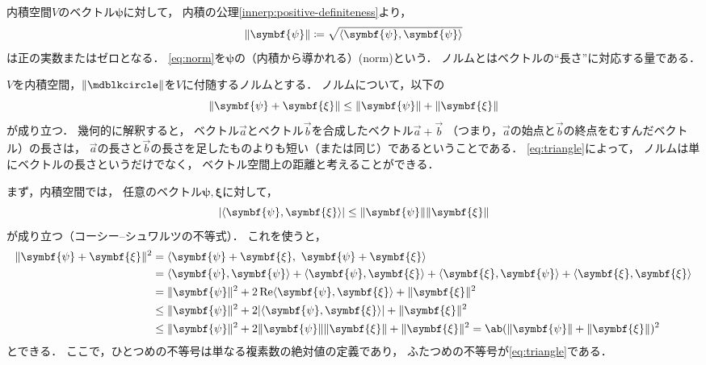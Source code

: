 \documentclass[
]{sotsu}
\newcommand{\bpsi}{\symbf{\psi}}
\newcommand{\bxi}{\symbf{\xi}}
\begin{document}
内積空間$V$のベクトル$\bpsi$に対して，
内積の公理\cref{innerp:positive-definiteness}より，
\begin{equation}
    \label{eq:norm}
    \norm{\bpsi} \coloneq \sqrt{\vphantom{\bpsi}\smash{\iparen{\bpsi, \bpsi}}}
\end{equation}
は正の実数またはゼロとなる．
\cref{eq:norm}を$\bpsi$の（内積から導かれる）(norm)という．
ノルムとはベクトルの``長さ''に対応する量である．

$V$を内積空間，$\norm{\bigdot}$を$V$に付随するノルムとする．
ノルムについて，以下の
\begin{equation}
    \label{eq:triangle}
    \norm{\bpsi + \bxi}
    \leq \norm{\bpsi} + \norm{\bxi}
\end{equation}
が成り立つ．
幾何的に解釈すると，
ベクトル$\vec{a}$とベクトル$\vec{b}$を合成したベクトル$\vec{a} + \vec{b}$
（つまり，$\vec{a}$の始点と$\vec{b}$の終点をむすんだベクトル）の長さは，
$\vec{a}$の長さと$\vec{b}$の長さを足したものよりも短い（または同じ）であるということである．
\cref{eq:triangle}によって，
ノルムは単にベクトルの長さというだけでなく，
ベクトル空間上の距離と考えることができる．

まず，内積空間では，
任意のベクトル$\bpsi, \bxi$に対して，
\begin{equation}
    \label{eq:Cauchy-Schwarz}
    \abs{\iparen{\bpsi, \bxi}} \leq \norm{\bpsi} \norm{\bxi}
\end{equation}
が成り立つ（コーシー--シュワルツの不等式）．
これを使うと，
\begin{equation*}
    \begin{split}
        \norm{\bpsi + \bxi}^2
        &= \iparen{\bpsi + \bxi, \  \bpsi + \bxi}
        \\
        &= \iparen{\bpsi, \bpsi}
            + \iparen{\bpsi, \bxi}
            + \iparen{\bxi, \bpsi}
            + \iparen{\bxi, \bxi}
        \\
        &= \norm{\bpsi}^2
            + 2 \Real \iparen{\bpsi, \bxi}
            + \norm{\bxi}^2
        \\
        &\leq \norm{\bpsi}^2 + 2 \abs{ \iparen{\bpsi, \bxi} } + \norm{\bxi}^2
        \\
        &\leq \norm{\bpsi}^2 + 2 \norm{\bpsi} \norm{\bxi} + \norm{\bxi}^2
        = \ab(\norm{\bpsi} + \norm{\bxi})^2
    \end{split}
\end{equation*}
とできる．
ここで，ひとつめの不等号は単なる複素数の絶対値の定義であり，
ふたつめの不等号が\cref{eq:triangle}である．
\end{document}
